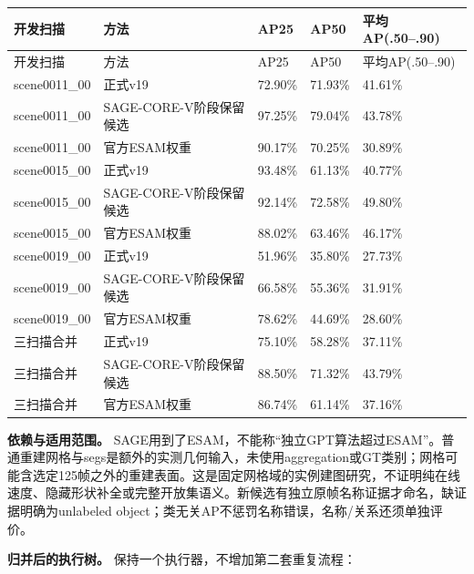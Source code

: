 \documentclass[UTF8,fontset=fandol]{ctexart}
\begin{document}
{\small
\begin{longtable}{|p{}|p{}|p{}|p{}|p{}|}
\hline
开发扫描 & 方法 & AP25 & AP50 & 平均AP(.50–.90) \\ \hline
\endfirsthead
\hline
开发扫描 & 方法 & AP25 & AP50 & 平均AP(.50–.90) \\ \hline
\endhead
scene0011\_00 & 正式v19 & 72.90\% & 71.93\% & 41.61\% \\ \hline
scene0011\_00 & SAGE-CORE-V阶段保留候选 & 97.25\% & 79.04\% & 43.78\% \\ \hline
scene0011\_00 & 官方ESAM权重 & 90.17\% & 70.25\% & 30.89\% \\ \hline
scene0015\_00 & 正式v19 & 93.48\% & 61.13\% & 40.77\% \\ \hline
scene0015\_00 & SAGE-CORE-V阶段保留候选 & 92.14\% & 72.58\% & 49.80\% \\ \hline
scene0015\_00 & 官方ESAM权重 & 88.02\% & 63.46\% & 46.17\% \\ \hline
scene0019\_00 & 正式v19 & 51.96\% & 35.80\% & 27.73\% \\ \hline
scene0019\_00 & SAGE-CORE-V阶段保留候选 & 66.58\% & 55.36\% & 31.91\% \\ \hline
scene0019\_00 & 官方ESAM权重 & 78.62\% & 44.69\% & 28.60\% \\ \hline
三扫描合并 & 正式v19 & 75.10\% & 58.28\% & 37.11\% \\ \hline
三扫描合并 & SAGE-CORE-V阶段保留候选 & 88.50\% & 71.32\% & 43.79\% \\ \hline
三扫描合并 & 官方ESAM权重 & 86.74\% & 61.14\% & 37.16\% \\ \hline
\end{longtable}
}

\textbf{依赖与适用范围。} SAGE用到了ESAM，不能称“独立GPT算法超过ESAM”。普通重建网格与segs是额外的实测几何输入，未使用aggregation或GT类别；网格可能含选定125帧之外的重建表面。这是固定网格域的实例建图研究，不证明纯在线速度、隐藏形状补全或完整开放集语义。新候选有独立原帧名称证据才命名，缺证据明确为unlabeled object；类无关AP不惩罚名称错误，名称/关系还须单独评价。



\textbf{归并后的执行树。} 保持一个执行器，不增加第二套重复流程：
\end{document}
